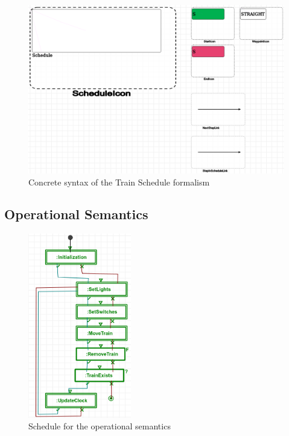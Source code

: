 \documentclass{article}
\begin{document}
\begin{figure}[H]
    \centering
    \includegraphics[width=\textwidth]{images/trainschedule_concrete_syntax.png}
    \caption{Concrete syntax of the Train Schedule formalism}
    \label{concrete_syntax_trainschedule}
\end{figure}

\subsection{Operational Semantics}

\begin{figure}[H]
    \centering
    \includegraphics[width=0.4\textwidth]{images/schedule_opsem.png}
    \caption{Schedule for the operational semantics}
    \label{schedule_opsem}
\end{figure}
\end{document}
